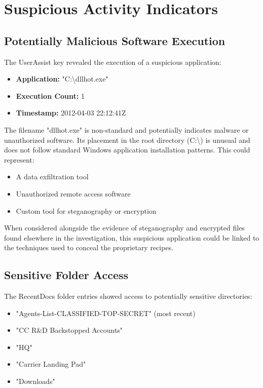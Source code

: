 \section{Suspicious Activity Indicators}
\subsection{Potentially Malicious Software Execution}
The UserAssist key revealed the execution of a suspicious application:

\begin{itemize}
    \item \textbf{Application:} "C:\textbackslash dllhot.exe"
    \item \textbf{Execution Count:} 1
    \item \textbf{Timestamp:} 2012-04-03 22:12:41Z
\end{itemize}

The filename "dllhot.exe" is non-standard and potentially indicates malware or unauthorized software. Its placement in the root directory (C:\textbackslash) is unusual and does not follow standard Windows application installation patterns. This could represent:

\begin{itemize}
    \item A data exfiltration tool
    \item Unauthorized remote access software
    \item Custom tool for steganography or encryption
\end{itemize}

When considered alongside the evidence of steganography and encrypted files found elsewhere in the investigation, this suspicious application could be linked to the techniques used to conceal the proprietary recipes.

\subsection{Sensitive Folder Access}
The RecentDocs folder entries showed access to potentially sensitive directories:

\begin{itemize}
    \item "Agents-List-CLASSIFIED-TOP-SECRET" (most recent)
    \item "CC R\&D Backstopped Accounts"
    \item "HQ"
    \item "Carrier Landing Pad"
    \item "Downloads"
\end{itemize}

